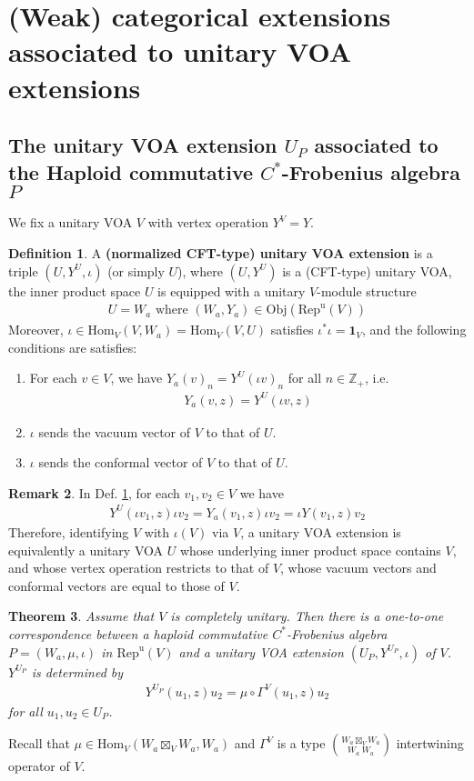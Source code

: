 \documentclass[11pt,b5paper,notitlepage]{article}
\theoremstyle{definition}
\newtheorem{df}{Definition}[section]
\newtheorem{rem}[df]{Remark}
\theoremstyle{plain}
\newtheorem{thm}[df]{Theorem}
\newcommand{\idt}{\mathbf{1}}
\newcommand{\Hom}{\mathrm{Hom}}
\newcommand{\uni}{\mathrm{u}}
\newcommand{\RepV}{{\mathrm{Rep}^\uni(V)}}
\newcommand{\Zbb}{\mathbb Z}
\newcommand{\Obj}{\mathrm{Obj}}
\numberwithin{equation}{section}
\begin{document}
\section{(Weak) categorical extensions associated to unitary VOA extensions}


\subsection{The unitary VOA extension $U_P$ associated to the Haploid commutative $C^*$-Frobenius algebra $P$}\label{lb107}

We fix a unitary VOA $V$ with vertex operation $Y^V=Y$.

\begin{df}\label{lb63}
A \textbf{(normalized CFT-type) unitary VOA extension} is a triple $(U,Y^U,\iota)$ (or simply $U$), where $(U,Y^U)$ is a (CFT-type) unitary VOA, the inner product space $U$ is equipped with a unitary $V$-module structure
\begin{align*}
U=W_a\text{ where }(W_a,Y_a)\in\Obj(\RepV)
\end{align*}
Moreover, $\iota\in\Hom_V(V,W_a)=\Hom_V(V,U)$ satisfies $\iota^*\iota=\idt_{V}$, and the following conditions are satisfies:
\begin{enumerate}[label=(\arabic*)]
\item For each $v\in V$, we have $Y_a(v)_n=Y^U(\iota v)_n$ for all $n\in\Zbb_+$, i.e.
\begin{align*}
Y_a(v,z)=Y^U(\iota v,z)
\end{align*}
\item $\iota$ sends the vacuum vector of $V$ to that of $U$.
\item $\iota$ sends the conformal vector of $V$ to that of $U$.
\end{enumerate}
\end{df}


\begin{rem}
In Def. \ref{lb63}, for each $v_1,v_2\in V$ we have
\begin{align*}
Y^U(\iota v_1,z)\iota v_2=Y_a(v_1,z)\iota v_2=\iota Y(v_1,z)v_2
\end{align*}
Therefore, identifying $V$ with $\iota(V)$ via $V$, a unitary VOA extension is equivalently a unitary VOA $U$ whose underlying inner product space contains $V$, and whose vertex operation restricts to that of $V$, whose vacuum vectors and conformal vectors are equal to those of $V$.
\end{rem}

\begin{thm}\label{lb75}
Assume that $V$ is completely unitary. Then there is a one-to-one correspondence between a haploid commutative $C^*$-Frobenius algebra $P=(W_a,\mu,\iota)$ in $\RepV$ and a unitary VOA extension $(U_P,Y^{U_P},\iota)$ of $V$. $Y^{U_P}$ is determined by
\begin{align}\label{eq49}
Y^{U_P}(u_1,z)u_2=\mu\circ\Gamma^V(u_1,z)u_2
\end{align}
for all $u_1,u_2\in U_P$.
\end{thm}
Recall that $\mu\in\Hom_V(W_a\boxtimes_V W_a,W_a)$ and $\Gamma^V$ is a type $W_a\boxtimes_V W_a\choose W_a~W_a$ intertwining operator of $V$.
\end{document}
